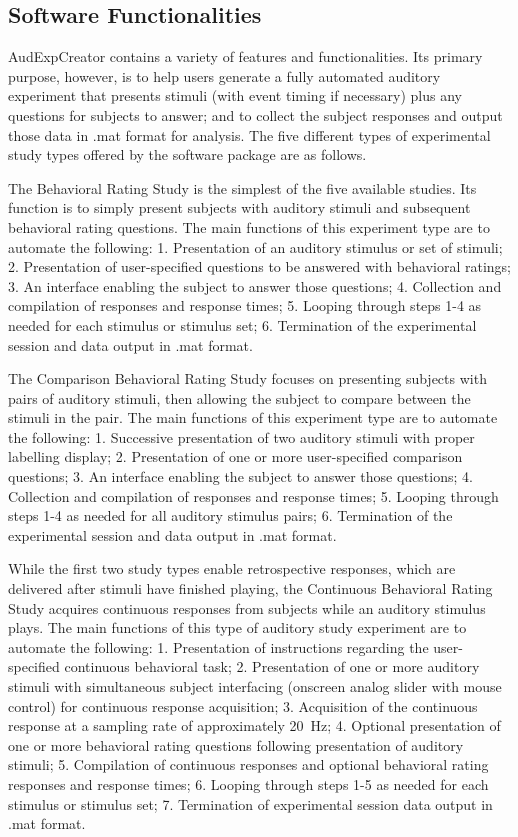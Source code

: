 \documentclass[preprint,12pt, a4paper]{elsarticle}
\begin{document}
\subsection{Software Functionalities}

AudExpCreator contains a variety of features and functionalities. Its primary purpose, however, is to help users generate a fully automated auditory experiment that presents stimuli (with event timing if necessary) plus any questions for subjects to answer; and to collect the subject responses and output those data in .mat format for analysis. The five different types of experimental study types offered by the software package are as follows.

The Behavioral Rating Study is the simplest of the five available studies. Its function is to simply present subjects with auditory stimuli and subsequent behavioral rating questions. The main functions of this experiment type are to automate the following: 1. Presentation of an auditory stimulus or set of stimuli; 2. Presentation of user-specified questions to be answered with behavioral ratings; 3. An interface enabling the subject to answer those questions; 4. Collection and compilation of responses and response times; 5. Looping through steps 1-4 as needed for each stimulus or stimulus set; 6. Termination of the experimental session and data output in .mat format.

The Comparison Behavioral Rating Study focuses on presenting subjects with pairs of auditory stimuli, then allowing the subject to compare between the stimuli in the pair. The main functions of this experiment type are to automate the following: 1. Successive presentation of two auditory stimuli with proper labelling display; 2. Presentation of one or more user-specified comparison questions; 3. An interface enabling the subject to answer those questions; 4. Collection and compilation of responses and response times; 5. Looping through steps 1-4 as needed for all auditory stimulus pairs; 6. Termination of the experimental session and data output in .mat format.

While the first two study types enable retrospective responses, which are delivered after stimuli have finished playing, the Continuous Behavioral Rating Study acquires continuous responses from subjects while an auditory stimulus plays. The main functions of this type of auditory study experiment are to automate the following: 1. Presentation of instructions regarding the user-specified continuous behavioral task; 2. Presentation of one or more auditory stimuli with simultaneous subject interfacing (onscreen analog slider with mouse control) for continuous response acquisition; 3. Acquisition of the continuous response at a sampling rate of approximately 20~Hz; 4. Optional presentation of one or more behavioral rating questions following presentation of auditory stimuli; 5. Compilation of continuous responses and optional behavioral rating responses and response times; 6. Looping through steps 1-5 as needed for each stimulus or stimulus set; 7. Termination of experimental session data output in .mat format.
\end{document}
